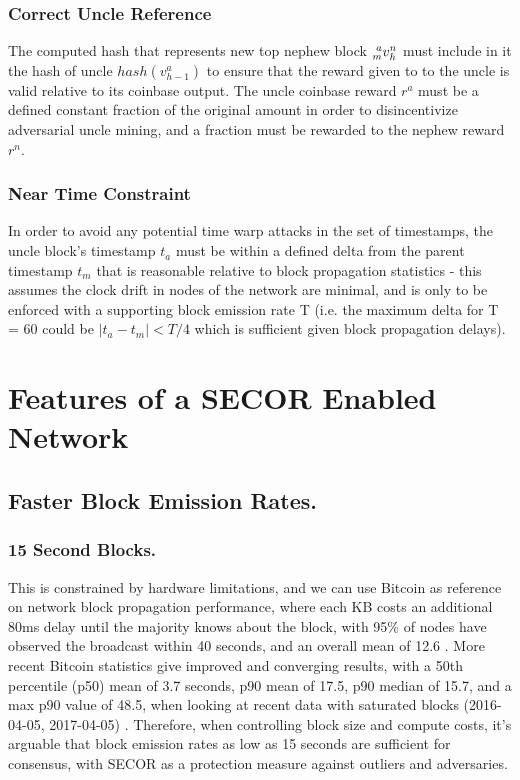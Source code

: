 \documentclass{article}
\begin{document}
\subsubsection{Correct Uncle Reference}
The computed hash that represents new top nephew block $\prescript{a}{m}v_h^n$ must include in it the hash of uncle $hash(v_{h-1}^a)$ to ensure that the reward given to to the uncle is valid relative to its coinbase output. The uncle coinbase reward $r^a$ must be a defined constant fraction of the original amount in order to disincentivize adversarial uncle mining, and a fraction must be rewarded to the nephew reward $r^n$.
\subsubsection{Near Time Constraint}
In order to avoid any potential time warp attacks in the set of timestamps, the uncle block's timestamp $t_a$ must be within a defined delta from the parent timestamp $t_m$ that is reasonable relative to block propagation statistics - this assumes the clock drift in nodes of the network are minimal, and is only to be enforced with a supporting block emission rate T (i.e. the maximum delta for T = 60 could be $\vert t_a - t_m \vert < T/4$ which is sufficient given block propagation delays).
\section{Features of a SECOR Enabled Network}
\subsection{Faster Block Emission Rates.}
\subsubsection{15 Second Blocks.}
This is constrained by hardware limitations, and we can use Bitcoin as reference on network block propagation performance, where each KB costs an additional 80ms delay until the majority knows about the block, with 95\% of nodes have observed the broadcast within 40 seconds, and an overall mean of 12.6 \cite{decker}. More recent Bitcoin statistics give improved and converging results, with a 50th percentile (p50) mean of 3.7 seconds, p90 mean of 17.5, p90 median of 15.7, and a max p90 value of 48.5, when looking at recent data with saturated blocks (2016-04-05, 2017-04-05) \cite{bitcoinstats}. Therefore, when controlling block size and compute costs, it's arguable that block emission rates as low as 15 seconds are sufficient for consensus, with SECOR as a protection measure against outliers and adversaries.
\end{document}
